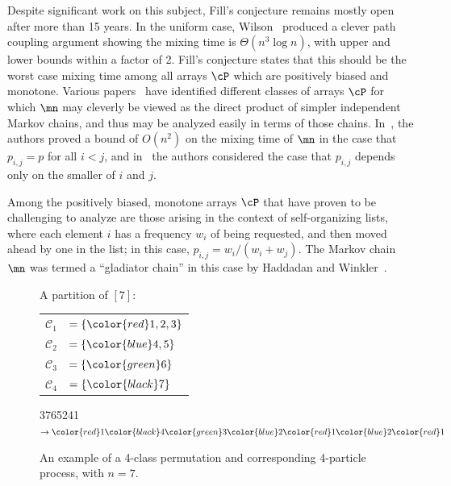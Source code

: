 Despite significant work on this subject, Fill's conjecture remains 
mostly open after more than 15 years. In the uniform case, Wilson~\cite{wilson} produced a 
clever path coupling argument showing the mixing 
time is $\Theta(n^3\log n)$, with upper and lower bounds within a factor of 2. 
Fill's conjecture states that this should be the worst case mixing time among all 
arrays $\cP$ which are positively biased and monotone. 
%
%
%
%
%
Various papers~\cite{BBHM05, bmrs} have identified 
different classes of
arrays   %
$\cP$ for which $\mn$ may cleverly be viewed as 
the direct product of simpler independent Markov chains, and thus may 
be analyzed easily in terms of those chains. In~\cite{BBHM05}, the 
authors proved a bound of $O(n^2)$ on the mixing time of $\mn$ in the 
case that $p_{i,j} = p$ for all $i<j$, and in~\cite{bmrs} the authors 
considered the case that $p_{i,j}$ depends only on the smaller of $i$ 
and $j$.

Among the positively biased, monotone %
%
arrays $\cP$  %
that have proven to 
be challenging to analyze are those arising in the context of 
self-organizing lists, where each element $i$ has a frequency $w_i$ of 
being requested, and then moved ahead
by  %
one in the list; in this case, 
$p_{i,j}=w_i/(w_i+w_j)$.  The Markov chain $\mn$ was termed a 
``gladiator chain'' in this case by Haddadan and Winkler~\cite{HW16}. 

\begin{figure}[htb]
  \centering
       \begin{minipage}[c]{.5\textwidth}
     \centering
     {\footnotesize
     A partition of $[7]$:
     \begin{tabular}{rl}
     $\mathcal{C}_1$ & $= \{{\color{red} 1,2,3}\}$\\
      $\mathcal{C}_2$ & $= \{{\color{blue} 4,5}\}$\\
      $\mathcal{C}_3$ & $= \{{\color{green} 6}\}$\\
       $\mathcal{C}_4$ & $= \{{\color{black} 7}\}$\\
     
     \end{tabular}}
     \end{minipage}\hfill
          \begin{minipage}[c]{.5\textwidth}
     \centering
           \newcommand{\one}{{\color{red}1}}
           \newcommand{\two}{{\color{blue}2}}
           \newcommand{\three}{{\color{green}3}}

          \newcommand{\four}{{\color{black}4}}

    {\color{red} 3}{\color{black}7}{\color{green}6}{\color{blue}5}{\color{red}2}{\color{blue}4}{\color{red}1} $\rightarrow \one \four \three \two \one\two\one$\\
    
       \end{minipage}\hfill
      \caption{An example of a 4-class permutation and corresponding 4-particle process, with $n=7$.}
\label{fig:Particle}
\end{figure}


